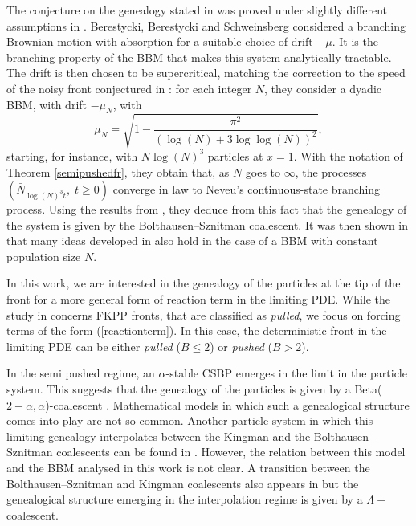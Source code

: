 \documentclass[11pt]{article}
\theoremstyle{plain}
\begin{document}
  The conjecture on the genealogy stated in \cite{Brunet2006a,Brunet_2007} was proved under slightly different assumptions in \cite{Berestycki2010}.
 Berestycki, Berestycki and Schweinsberg \cite{Berestycki2010}  considered a branching Brownian motion with absorption for a suitable choice of drift $-\mu$. 
 It is the branching property of the BBM that makes this system analytically tractable.   The drift is then chosen to be supercritical, matching the correction to the speed of the noisy front conjectured in \cite{Brunet2006}: for each integer $N$, they consider a dyadic BBM, with drift $-\mu_N$, with 
\begin{equation}
\mu_N=\sqrt{1-\frac{\pi^2}{(\log(N)+3\log\log(N))^2}},\label{driftBBS}
\end{equation}
starting, for instance, with $N\log(N)^3$ particles at $x=1$. With the notation of Theorem \ref{semipushedfr}, they obtain that, as $N$ goes to $\infty$, the processes $\left(\bar{N}_{\log(N)^3t},\;t\geqslant 0\right)$ converge in law to Neveu's continuous-state branching process. Using the results from \cite{bertoin2000bolthausen}, they deduce from this fact that the genealogy of the system is given by the Bolthausen--Sznitman coalescent. It was then shown in \cite{Maillard:2016uw} that many ideas developed in \cite{Berestycki2010} also hold in the case of a BBM with constant population size $N$.


In this work, we are interested in the genealogy of the particles at the tip of the front for a more general form of reaction term in the limiting PDE. While the study in \cite{Brunet2006,Brunet2006a} concerns FKPP fronts, that are classified as \textit{pulled}, we focus on forcing terms of the form (\ref{reactionterm}). In this case, the deterministic front in the limiting PDE can be either \textit{pulled} ($B\leqslant 2$) or \textit{pushed} ($B>2$). 

In the semi pushed regime,  an $\alpha$-stable CSBP emerges in the limit in the particle system. This suggests that the genealogy of the particles  is given by a Beta($2-\alpha,\alpha$)-coalescent \cite{Birkner2005}. Mathematical models in which such a genealogical structure comes into play are not so common. Another particle system in which this limiting genealogy interpolates between the Kingman and the Bolthausen--Sznitman coalescents can be found in \cite{cortines2018genealogy}. However, the relation between this model and the BBM analysed in this work is not clear. A transition between the Bolthausen--Sznitman and Kingman coalescents also appears in \cite{Brunet2012} but the genealogical structure emerging in the interpolation regime is given by a $\Lambda-$coalescent.
\end{document}
